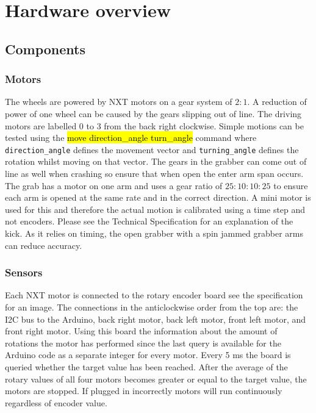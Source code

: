 \documentclass[a4paper,12pt]{article}
\newcommand{\hg}[1]{\hl{\ttfamily #1}}
\begin{document}
\section{Hardware overview}

\subsection{Components}
\subsubsection{Motors}
The wheels are powered by NXT motors on a gear system of $2:1$. A reduction of power of one wheel can be caused by the gears slipping out of line. The driving motors are labelled 0 to 3 from the back right clockwise. Simple motions can be tested using the \hg{move direction\_angle turn\_angle} command where \texttt{direction\_angle} defines the movement vector and \texttt{turning\_angle} defines the rotation whilst moving on that vector. The gears in the grabber can come out of line as well when crashing so ensure that when open the enter arm span occurs. The grab has a motor on one arm and uses a gear ratio of $25:10:10:25$ to ensure each arm is opened at the same rate and in the correct direction. A mini motor is used for this and therefore the actual motion is calibrated using a time step and not encoders. Please see the Technical Specification for an explanation of the kick. As it relies on timing, the open grabber with a spin jammed grabber arms can reduce accuracy.

\subsubsection{Sensors}

Each NXT motor is connected to the rotary encoder board see the specification for an image. The connections in the anticlockwise order from the top are: the I2C bus to the Arduino, back right motor, back left motor, front left motor, and front right motor. Using this board the information about the amount of rotations the motor has performed since the last query is available for the Arduino code as a separate integer for every motor. Every 5 ms the board is queried whether the target value has been reached. After the average of the rotary values of all four motors becomes greater or equal to the target value, the motors are stopped. If plugged in incorrectly motors will run continuously regardless of encoder value.
\end{document}
